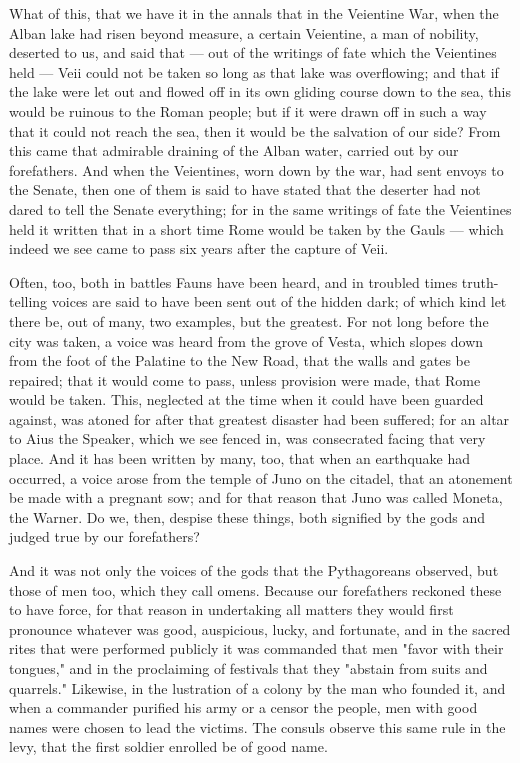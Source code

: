  What of this, that we have it in the annals that in the Veientine War, when the Alban lake had risen beyond measure, a certain Veientine, a man of nobility, deserted to us, and said that — out of the writings of fate which the Veientines held — Veii could not be taken so long as that lake was overflowing; and that if the lake were let out and flowed off in its own gliding course down to the sea, this would be ruinous to the Roman people; but if it were drawn off in such a way that it could not reach the sea, then it would be the salvation of our side? From this came that admirable draining of the Alban water, carried out by our forefathers. And when the Veientines, worn down by the war, had sent envoys to the Senate, then one of them is said to have stated that the deserter had not dared to tell the Senate everything; for in the same writings of fate the Veientines held it written that in a short time Rome would be taken by the Gauls — which indeed we see came to pass six years after the capture of Veii.

 Often, too, both in battles Fauns have been heard, and in troubled times truth-telling voices are said to have been sent out of the hidden dark; of which kind let there be, out of many, two examples, but the greatest. For not long before the city was taken, a voice was heard from the grove of Vesta, which slopes down from the foot of the Palatine to the New Road, that the walls and gates be repaired; that it would come to pass, unless provision were made, that Rome would be taken. This, neglected at the time when it could have been guarded against, was atoned for after that greatest disaster had been suffered; for an altar to Aius the Speaker, which we see fenced in, was consecrated facing that very place. And it has been written by many, too, that when an earthquake had occurred, a voice arose from the temple of Juno on the citadel, that an atonement be made with a pregnant sow; and for that reason that Juno was called Moneta, the Warner. Do we, then, despise these things, both signified by the gods and judged true by our forefathers?

 And it was not only the voices of the gods that the Pythagoreans observed, but those of men too, which they call omens. Because our forefathers reckoned these to have force, for that reason in undertaking all matters they would first pronounce whatever was good, auspicious, lucky, and fortunate, and in the sacred rites that were performed publicly it was commanded that men "favor with their tongues," and in the proclaiming of festivals that they "abstain from suits and quarrels." Likewise, in the lustration of a colony by the man who founded it, and when a commander purified his army or a censor the people, men with good names were chosen to lead the victims. The consuls observe this same rule in the levy, that the first soldier enrolled be of good name.


